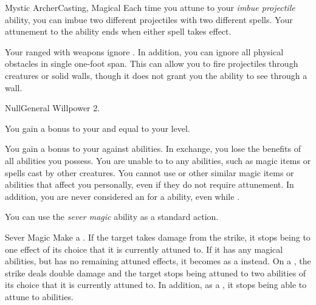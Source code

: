 \begin{magicalfeat}{Mystic Archer}{Casting, Magical}
         Each time you attune to your \textit{imbue projectile} ability, you can imbue two different projectiles with two different spells.
        Your attunement to the ability ends when either spell takes effect.

         Your ranged  with  weapons ignore .
        In addition, you can ignore all physical obstacles in single one-foot span.
        This can allow you to fire projectiles through creatures or solid walls, though it does not grant you the ability to see through a wall.
    \end{magicalfeat}

    \begin{feat}{Null}{General}
        \featpre Willpower 2.

         You gain a bonus to your  and  equal to your level.

         You gain a  bonus to your  against \magical abilities.
        In exchange, you lose the benefits of all \magical abilities you possess.
        You are unable to  to any \magical abilities, such as magic items or spells cast by other creatures.
        You cannot use  or other similar magic items or abilities that affect you personally, even if they do not require attunement.
        In addition, you are never considered an  for a \magical ability, even while \unconscious.

         You can use the \textit{sever magic} ability as a standard action.
        \begin{activeability}{Sever Magic}
            \rankline
            Make a .
            If the target takes damage from the strike, it stops being  to one effect of its choice that it is currently attuned to.
            If it has any magical abilities, but has no remaining attuned effects, it becomes \stunned as a  instead.
            On a , the strike deals double damage and the target stops being attuned to two abilities of its choice that it is currently attuned to.
            In addition, as a , it stops being able to attune to abilities.


\end{activeability}
\end{feat}
